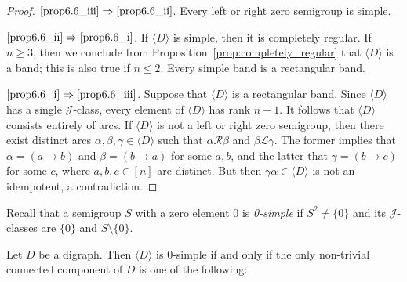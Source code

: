 \documentclass[ALCO,ThmDefs,Unicode,epreuves]{cedram}
\newcommand{\vertex}[3]{\node [vertex] (#1) at (#2, #3 * 1.7) {};}
\newcommand{\arc}[2]{{\draw[-latex] (#1) edge (#2);}}
\newcommand{\genset}[1]{\langle#1\rangle}
\newcommand{\LL}{\mathcal{L}}
\newcommand{\R}{\mathcal{R}}
\newcommand{\J}{\mathcal{J}}
\newcommand{\nset}{[n]}
\begin{document}
\begin{proof}
$\ref{prop6.6_iii}\Rightarrow\ref{prop6.6_ii}$. Every left or right zero semigroup is simple.

$\ref{prop6.6_ii}\Rightarrow\ref{prop6.6_i}$. If $\genset D$ is simple, then it is completely
 regular. If $n\geq3$, then we conclude from
 Proposition~\ref{prop:completely_regular} that $\genset D$ is a band; this is
 also true if $n\leq2$. Every simple band is a rectangular band.

$\ref{prop6.6_i}\Rightarrow\ref{prop6.6_iii}$. Suppose that $\genset D$ is a rectangular band.
 Since $\genset D$ has a single $\J$-class, every element of $\genset D$ has
 rank $n-1$. It follows that $\genset D$ consists entirely of arcs. If
 $\genset D$ is not a left or right zero semigroup, then there exist distinct
 arcs $\alpha,\beta,\gamma\in\genset D$ such that $\alpha\R\beta$ and
 $\beta\LL\gamma$. The former implies that $\alpha=(a\to b)$ and $\beta=(b\to
 a)$ for some $a,b$, and the latter that $\gamma=(b\to c)$ for some $c$, where
 $a,b,c\in\nset$ are distinct. But then $\gamma\alpha\in\genset D$ is not an
 idempotent, a contradiction.
\end{proof}

Recall that a semigroup $S$ with a zero element $0$ is \emph{0-simple} if
$S^2\not=\{0\}$ and its $\J$-classes are $\{0\}$ and $S\setminus\{0\}$.

\goodbreak
\begin{proposition}\label{prop-0-simple}
 Let $D$ be a digraph. Then $\genset{D}$ is
 $0$-simple if and only if the only non-trivial connected component of $D$ is
 one of the following: 

\smallskip
\begin{center}
 \qquad\qquad
 \end{center}
\end{proposition}
\end{document}

